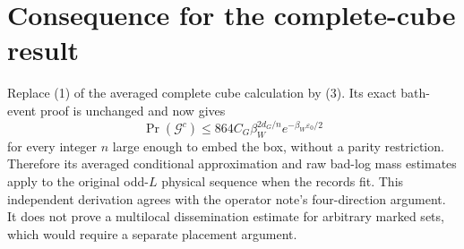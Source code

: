 \documentclass{article}
\begin{document}
\section{Consequence for the complete-cube result}
Replace (1) of the averaged complete cube calculation by (3). Its exact bath-event proof is unchanged and now gives
\[
 \Pr(\mathcal G^c)\leq864C_G\beta_W^{2d_G/n}
 e^{-\beta_W\varepsilon_0/2}
\]
for every integer $n$ large enough to embed the box, without a parity restriction. Therefore its averaged conditional approximation and raw bad-log mass estimates apply to the original odd-$L$ physical sequence when the records fit. This independent derivation agrees with the operator note's four-direction argument. It does not prove a multilocal dissemination estimate for arbitrary marked sets, which would require a separate placement argument.
\end{document}
